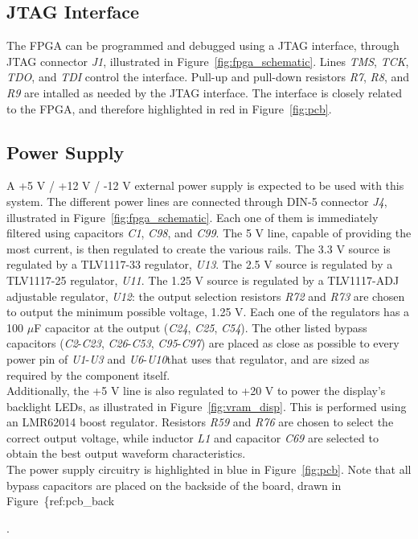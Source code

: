 \documentclass{scrartcl}
\begin{document}
{	\subsection{JTAG Interface}
	The FPGA can be programmed and debugged using a JTAG interface, through JTAG connector \textit{J1}, illustrated in Figure~\ref{fig:fpga_schematic}. Lines \textit{TMS}, \textit{TCK}, \textit{TDO}, and \textit{TDI} control the interface. Pull-up and pull-down resistors \textit{R7}, \textit{R8}, and \textit{R9} are intalled as needed by the JTAG interface. The interface is closely related to the FPGA, and therefore highlighted in red in Figure~\ref{fig:pcb}.\\

	\subsection{Power Supply}
	A +5 V / +12 V / -12 V external power supply is expected to be used with this system. The different power lines are connected through DIN-5 connector \textit{J4}, illustrated in Figure~\ref{fig:fpga_schematic}. Each one of them is immediately filtered using capacitors \textit{C1}, \textit{C98}, and \textit{C99}. The 5 V line, capable of providing the most current, is then regulated to create the various rails. The 3.3 V source is regulated by a TLV1117-33 regulator, \textit{U13}. The 2.5 V source is regulated by a TLV1117-25 regulator, \textit{U11}. The 1.25 V source is regulated by a TLV1117-ADJ adjustable regulator, \textit{U12}: the output selection resistors \textit{R72} and \textit{R73} are chosen to output the minimum possible voltage, 1.25 V. Each one of the regulators has a 100 $\mu$F capacitor at the output (\textit{C24}, \textit{C25}, \textit{C54}). The other listed bypass capacitors (\textit{C2}-\textit{C23}, \textit{C26}-\textit{C53}, \textit{C95}-\textit{C97}) are placed as close as possible to every power pin of \textit{U1}-\textit{U3} and \textit{U6}-\textit{U10}that uses that regulator, and are sized as required by the component itself.\\

	Additionally, the +5 V line is also regulated to +20 V to power the display's backlight LEDs, as illustrated in Figure~\ref{fig:vram_disp}. This is performed using an LMR62014 boost regulator. Resistors \textit{R59} and \textit{R76} are chosen to select the correct output voltage, while inductor \textit{L1} and capacitor \textit{C69} are selected to obtain the best output waveform characteristics.\\

	The power supply circuitry is highlighted in blue in Figure~\ref{fig:pcb}. Note that all bypass capacitors are placed on the backside of the board, drawn in Figure~\{ref:pcb_back}.\\
	
\end{document}
